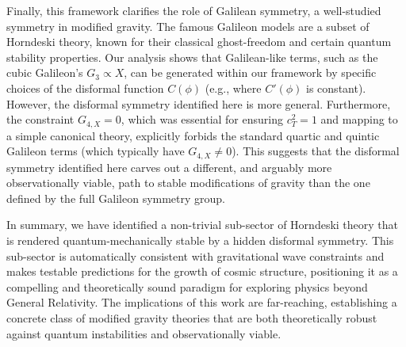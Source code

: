 \documentclass[twocolumn]{aastex631}
\begin{document}
Finally, this framework clarifies the role of Galilean symmetry, a well-studied symmetry in modified gravity. The famous Galileon models are a subset of Horndeski theory, known for their classical ghost-freedom and certain quantum stability properties. Our analysis shows that Galilean-like terms, such as the cubic Galileon's $G_3 \propto X$, can be generated within our framework by specific choices of the disformal function $C(\phi)$ (e.g., where $C'(\phi)$ is constant). However, the disformal symmetry identified here is more general. Furthermore, the constraint $G_{4,X}=0$, which was essential for ensuring $c_T^2=1$ and mapping to a simple canonical theory, explicitly forbids the standard quartic and quintic Galileon terms (which typically have $G_{4,X} \neq 0$). This suggests that the disformal symmetry identified here carves out a different, and arguably more observationally viable, path to stable modifications of gravity than the one defined by the full Galileon symmetry group.

In summary, we have identified a non-trivial sub-sector of Horndeski theory that is rendered quantum-mechanically stable by a hidden disformal symmetry. This sub-sector is automatically consistent with gravitational wave constraints and makes testable predictions for the growth of cosmic structure, positioning it as a compelling and theoretically sound paradigm for exploring physics beyond General Relativity. The implications of this work are far-reaching, establishing a concrete class of modified gravity theories that are both theoretically robust against quantum instabilities and observationally viable.
\end{document}
